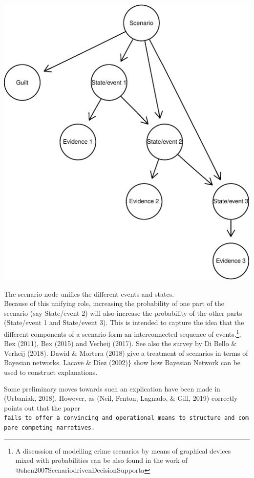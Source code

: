 \documentclass[11pt,dvipsnames,enabledeprecatedfontcommands]{scrartcl}
\begin{document}
\begin{center}\includegraphics{BNfiles/unnamed-chunk-13-1} \end{center}

\noindent The scenario node unifies the different events and states.\\
Because of this unifying role, increasing the probability of one part of
the scenario (say \textsf{State/event 2}) will also increase the
probability of the other parts (\textsf{State/event 1} and
\textsf{State/event 3}). This is intended to capture the idea that the
different components of a scenario form an interconnected sequence of
events.\footnote{A discussion
of modelling crime scenarios by means of  graphical devices mixed with probabilities can be also found in the work of @shen2007ScenariodrivenDecisionSupporta},
Bex (2011), Bex (2015) and Verheij (2017). See also the survey by Di
Bello \& Verheij (2018). Dawid \& Mortera (2018) give a treatment of
scenarios in terms of Bayesian networks. Lacave \& Dı́ez (2002)\} show
how Bayesian Network can be used to construct explanations.

Some preliminary moves towards such an explication have been made in
(Urbaniak, 2018). However, as (Neil, Fenton, Lagnado, \& Gill, 2019)
correctly points out that the paper
\texttt{fails\ to\ offer\ a\ convincing\ and\ operational\ means\ to\ structure\ and\ compare\ competing\ narratives.}
\end{document}
